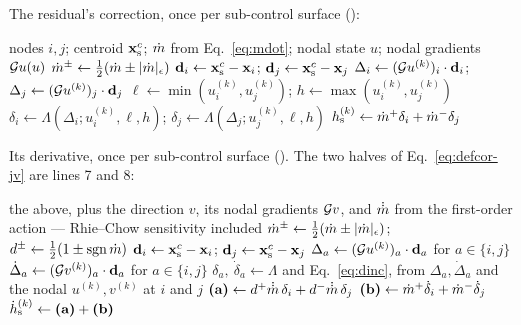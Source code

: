 The residual's correction, once per sub-control surface
():

\begin{algorithm}[H]
\caption{$\mathbf{h}_\scs$, the deferred correction (residual)}
\begin{algorithmic}[1]
\Require nodes $i,j$; centroid $\mathbf{x}^c_{\mathrm{s}}$; $\dot{m}$ from Eq.~\eqref{eq:mdot};
         nodal state $u$; nodal gradients $\mathcal{G} u(u)$
\State $\dot{m}^{\pm} \gets \tfrac12(\dot{m} \pm |\dot{m}|_\epsilon)$
\State $\mathbf{d}_i \gets \mathbf{x}^c_{\mathrm{s}} - \mathbf{x}_i$; \quad $\mathbf{d}_j \gets \mathbf{x}^c_{\mathrm{s}} - \mathbf{x}_j$
  \State $\Delta_i \gets (\mathcal{G} u^{(k)})_i \cdot \mathbf{d}_i$; \quad
         $\Delta_j \gets (\mathcal{G} u^{(k)})_j \cdot \mathbf{d}_j$
  \State $\ell \gets \min(u^{(k)}_i, u^{(k)}_j)$; \quad $h \gets \max(u^{(k)}_i, u^{(k)}_j)$
  \State $\delta_i \gets \Lambda(\Delta_i; u^{(k)}_i, \ell, h)$; \quad
         $\delta_j \gets \Lambda(\Delta_j; u^{(k)}_j, \ell, h)$
  \State $h^{(k)}_{\mathrm{s}} \gets \dot{m}^{+}\delta_i + \dot{m}^{-}\delta_j$
\EndFor
\end{algorithmic}
\end{algorithm}

\noindent
Its derivative, once per sub-control surface
(). The two halves of Eq.~\eqref{eq:defcor-jv} are lines 7
and 8:

\begin{algorithm}[H]
\caption{$(\partial\mathbf{h}_\scs/\partial\uvec)\,v$, the exact correction derivative}
\begin{algorithmic}[1]
\Require the above, plus the direction $v$, its nodal gradients $\mathcal{G} v$, and
         $\dot{\dot{m}}$ from the first-order action --- Rhie--Chow sensitivity included
\State $\dot{m}^{\pm} \gets \tfrac12(\dot{m} \pm |\dot{m}|_\epsilon)$;\quad
       $d^{\pm} \gets \tfrac12(1 \pm \operatorname{sgn}\dot{m})$
\State $\mathbf{d}_i \gets \mathbf{x}^c_{\mathrm{s}} - \mathbf{x}_i$; \quad $\mathbf{d}_j \gets \mathbf{x}^c_{\mathrm{s}} - \mathbf{x}_j$
  \State $\Delta_a \gets (\mathcal{G} u^{(k)})_a \cdot \mathbf{d}_a$ \quad for $a \in \{i,j\}$
  \State $\dot{\Delta}_a \gets (\mathcal{G} v^{(k)})_a \cdot \mathbf{d}_a$ \quad for $a \in \{i,j\}$
  \State $\delta_a,\ \dot{\delta}_a \gets \Lambda$ and Eq.~\eqref{eq:dinc}, from
         $\Delta_a, \dot{\Delta}_a$ and the nodal $u^{(k)}, v^{(k)}$ at $i$ and $j$
  \State $\textbf{(a)} \gets d^{+}\dot{\dot{m}}\,\delta_i + d^{-}\dot{\dot{m}}\,\delta_j$
  \State $\textbf{(b)} \gets \dot{m}^{+}\dot{\delta}_i + \dot{m}^{-}\dot{\delta}_j$
  \State $\dot{h}^{(k)}_{\mathrm{s}} \gets \textbf{(a)} + \textbf{(b)}$
\EndFor
\end{algorithmic}
\end{algorithm}

